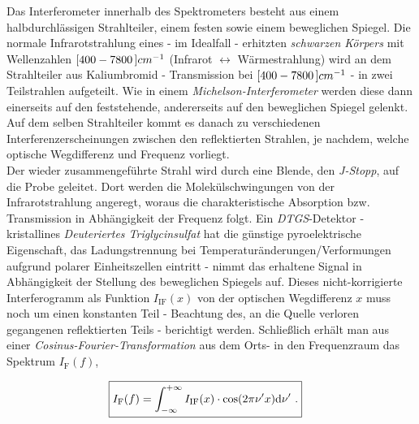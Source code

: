 \documentclass[a4paper,10pt,twocolumn]{article}
\newcommand{\diff}{\textnormal{d}}
\newcommand{\ix}[1]{_\text{#1}}
\newcommand{\tilt}[1]{\textit{#1}}
\begin{document}
		Das Interferometer innerhalb des Spektrometers besteht aus einem halbdurchl\"assigen Strahlteiler, einem festen sowie einem beweglichen Spiegel. Die normale Infrarotstrahlung eines - im Idealfall - erhitzten \tilt{schwarzen K\"orpers} \cite{FTIRSpek} mit Wellenzahlen $\unit[[400-7800]]{cm^{-1}}$ (Infrarot $\leftrightarrow$ W\"armestrahlung) wird an dem Strahlteiler aus Kaliumbromid - Transmission bei $\unit[[400-7800]]{cm^{-1}}$ - in zwei Teilstrahlen aufgeteilt. Wie in einem \tilt{Michelson-Interferometer} werden diese dann einerseits auf den feststehende, andererseits auf den beweglichen Spiegel gelenkt. Auf dem selben Strahlteiler kommt es danach zu verschiedenen Interferenzerscheinungen zwischen den reflektierten Strahlen, je nachdem, welche optische Wegdifferenz und Frequenz vorliegt.\\
		Der wieder zusammengef\"uhrte Strahl wird durch eine Blende, den \tilt{J-Stopp}, auf die Probe geleitet. Dort werden die Molek\"ulschwingungen von der Infrarotstrahlung angeregt, woraus die charakteristische Absorption bzw. Transmission in Abh\"angigkeit der Frequenz folgt. Ein \tilt{DTGS}-Detektor - kristallines \tilt{Deuteriertes Triglycinsulfat} hat die g\"unstige pyroelektrische Eigenschaft, das Ladungstrennung bei Temperatur\"anderungen/Verformungen aufgrund polarer Einheitszellen eintritt - nimmt das erhaltene Signal in Abh\"angigkeit der Stellung des beweglichen Spiegels auf. Dieses nicht-korrigierte Interferogramm als Funktion $I\ix{IF}(x)$ von der optischen Wegdifferenz $x$ muss noch um einen konstanten Teil - Beachtung des, an die Quelle verloren gegangenen reflektierten Teils - berichtigt werden. Schlie{\ss}lich erh\"alt man aus einer  \tilt{Cosinus-Fourier-Transformation} aus dem Orts- in den Frequenzraum das Spektrum $I\ix{F}(f)$,
		
			\begin{align}
				\Aboxed{
				I\ix{F}(f)=\int_{-\infty}^{+\infty}I\ix{IF}(x)\cdot\cos(2\pi\nu^{\prime}x)\diff \nu^{\prime}\,\, .
				}
				\label{eq:fourier}
			\end{align}
		
\end{document}
